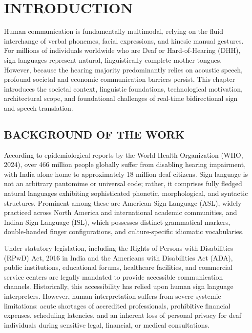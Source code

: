 \documentclass[12pt,a4paper]{report}
\begin{document}
\tableofcontents
\clearpage
\listoftables
\clearpage
\listoffigures
\clearpage

\setcounter{page}{1}
\chapter{INTRODUCTION} \label{chap:intro}
Human communication is fundamentally multimodal, relying on the fluid interchange of verbal phonemes, facial expressions, and kinesic manual gestures. For millions of individuals worldwide who are Deaf or Hard-of-Hearing (DHH), sign languages represent natural, linguistically complete mother tongues. However, because the hearing majority predominantly relies on acoustic speech, profound societal and economic communication barriers persist. This chapter introduces the societal context, linguistic foundations, technological motivation, architectural scope, and foundational challenges of real-time bidirectional sign and speech translation.

\section{BACKGROUND OF THE WORK} \label{sec:intro-bg}
According to epidemiological reports by the World Health Organization (WHO, 2024), over 466 million people globally suffer from disabling hearing impairment, with India alone home to approximately 18 million deaf citizens. Sign language is not an arbitrary pantomime or universal code; rather, it comprises fully fledged natural languages exhibiting sophisticated phonetic, morphological, and syntactic structures. Prominent among these are American Sign Language (ASL), widely practiced across North America and international academic communities, and Indian Sign Language (ISL), which possesses distinct grammatical markers, double-handed finger configurations, and culture-specific idiomatic vocabularies.

Under statutory legislation, including the Rights of Persons with Disabilities (RPwD) Act, 2016 in India and the Americans with Disabilities Act (ADA), public institutions, educational forums, healthcare facilities, and commercial service centers are legally mandated to provide accessible communication channels. Historically, this accessibility has relied upon human sign language interpreters. However, human interpretation suffers from severe systemic limitations: acute shortages of accredited professionals, prohibitive financial expenses, scheduling latencies, and an inherent loss of personal privacy for deaf individuals during sensitive legal, financial, or medical consultations.
\end{document}
